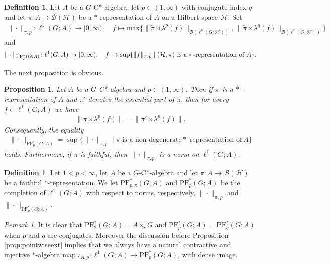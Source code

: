 \documentclass[12pt]{amsart}
\newtheorem{prop}[thm]{Proposition}
\theoremstyle{definition}
\newtheorem{defn}[thm]{Definition}
\theoremstyle{remark}
\newtheorem{rem}[thm]{Remark}
\numberwithin{equation}{section}
\newcommand{\mc}{\mathcal}
\newcommand{\PF}[3]{\ensuremath{\mathrm{PF}_{#1}^*\left(#2; #3\right)}}
\begin{document}
\begin{defn}
	Let $A$ be a $G$-C*-algebra, let $p\in (1,\infty)$ with conjugate index $q$ and let $\pi\colon A \to \mathcal{B}(\mathcal{H})$
	be a $*$-representation of $A$ on a Hilbert space $\mathcal{H}$. Set
	\begin{align*}
		\| \cdot \|_{\pi,p}\colon  \ell^1(G; A )\to [0,\infty),\quad f \mapsto	 \mbox{max}\lbrace
		\| \widetilde{\pi}\rtimes \lambda^p(f)\|_{\mathcal{B}(\ell^p(G;\mathcal{H}))},\,
		\| \widetilde{\pi}\rtimes \lambda^q(f)\|_{\mathcal{B}(\ell^q(G;\mathcal{H}))}\rbrace
	\end{align*}
and
	\begin{align*}
		\|\cdot \|_{\textup{PF}^*_p(G;A)}\colon \ell^1(G;A)\to [0,\infty), \quad f \mapsto \sup
		\lbrace \| f \|_{\pi,p} \mid (\mathcal{H},\pi) \mbox{ is a} \ast\mbox{-representation of}\ A  	\rbrace.
	\end{align*}
\end{defn}

The next proposition is obvious.

\begin{prop}
	Let $A$ be a $G$-C*-algebra and $p\in (1,\infty)$. Then if $\pi$ is a $*$-representation of $A$ and $\pi'$ denotes the essential part of $\pi$,
	then for every $f\in \ell^1(G;A)$ we have
	\begin{align*}
		\|\pi \rtimes \lambda^p(f)\| = \| \pi'\rtimes \lambda^p(f)\|.
	\end{align*}
Consequently, the equality
	\begin{align*}
		\| \cdot \|_{\PF{p}{G}{A} } = \sup\lbrace \| \cdot \|_{\pi, p} \mid \pi \mbox{ is
		a non-degenerate} \ast\mbox{-representation of}\ A \rbrace
	\end{align*}
	holds. Furthermore, if $\pi$ is faithful, then $\|\cdot\|_{\pi,p}$ is a norm on $\ell^1(G;A)$.
\end{prop}



\begin{defn}
	Let $1<p< \infty$, let $A$ be a $G$-C*-algebra and let $\pi\colon A\rightarrow \mc{B}(\mc{H})$ be a faithful $*$-representation. We let $\PF{p,\pi}{G}{A}$ and $\PF{p}{G}{A}$ be the completion of $\ell^1(G;A)$ with respect to norms, respectively, $\|\cdot\|_{\pi,p}$ and $\| \cdot\|_{\PF{p}{G}{A}}$. 
\end{defn}


\begin{rem} \label{rem:contractive}
It is clear that $\PF{2}{G}{A}=A \rtimes_r G$ and $\PF{p}{G}{A}=\PF{q}{G}{A}$ when $p$ and $q$ are conjugates. Moreover the discussion before Proposition \ref{prop:pointwiseext} implies that we always have a natural contractive and injective $*$-algebra map $\iota_{A,p}\colon\ell^1(G;A) \to \PF{p}{G}{A}$, with dense image.
\end{rem}
\end{document}
